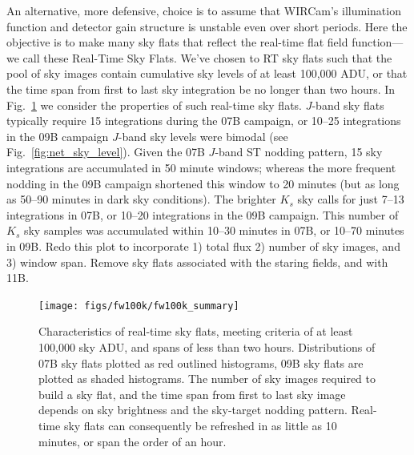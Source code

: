 \documentclass[iop]{emulateapj}
\newcommand{\todo}[1]{\textcolor{RedOrange}{#1}} %
\newcommand{\Fig}[1]{Fig.~\ref{fig:#1}}  %
\begin{document}
An alternative, more defensive, choice is to assume that WIRCam's illumination function and detector gain structure is unstable even over short periods.
Here the objective is to make many sky flats that reflect the real-time flat field function---we call these Real-Time Sky Flats.
We've chosen to RT sky flats such that the pool of sky images contain cumulative sky levels of at least 100,000 ADU, or that the time span from first to last sky integration be no longer than two hours.
In \Fig{fw100k_summary} we consider the properties of such real-time sky flats.
$J$-band sky flats typically require 15 integrations during the 07B campaign, or 10--25 integrations in the 09B campaign $J$-band sky levels were bimodal (see \Fig{net_sky_level}).
Given the 07B $J$-band ST nodding pattern, 15 sky integrations are accumulated in 50 minute windows; whereas the more frequent nodding in the 09B campaign shortened this window to 20 minutes (but as long as 50--90 minutes in dark sky conditions).
The brighter $K_s$ sky calls for just 7--13 integrations in 07B, or 10--20 integrations in the 09B campaign.
This number of $K_s$ sky samples was accumulated within 10--30 minutes in 07B, or 10--70 minutes in 09B.
\todo{Redo this plot to incorporate 1) total flux 2) number of sky images, and 3) window span. Remove sky flats associated with the staring fields, and with 11B.}

\begin{figure}[t]
\centering
\texttt{[image: figs/fw100k/fw100k\_summary]}
\caption{
Characteristics of real-time sky flats, meeting criteria of at least 100,000 sky ADU, and spans of less than two hours.
Distributions of 07B sky flats plotted as red outlined histograms, 09B sky flats are plotted as shaded histograms.
The number of sky images required to build a sky flat, and the time span from first to last sky image depends on sky brightness and the sky-target nodding pattern.
Real-time sky flats can consequently be refreshed in as little as 10 minutes, or span the order of an hour.
}
\label{fig:fw100k_summary}
\end{figure}
\end{document}
